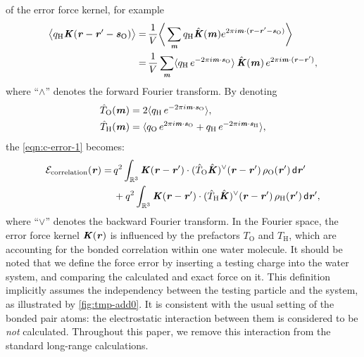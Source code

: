\documentclass[journal=jacsat,manuscript=article]{achemso}
\newcommand{\recheck}[1]{{\color{black} #1}}
\renewcommand{\v}[1]{\textbf{\textit{#1}}}
\renewcommand{\d}[1]{\textsf{#1}}
\begin{document}
of the error force kernel, for example
\begin{align} \nonumber
  \big\langle
  q_{\textrm{H}}\v K(\v r - \v r' - \v s_{\textrm{O}})
  \big\rangle 
  =\,&
  \frac1V\bigg\langle
  \sum_{\v m}
  q_{\textrm{H}}\hat{\v K}(\v m)
  e^{2\pi i\v m\cdot(\v r - \v r' - \v s_{\textrm{O}})} 
  \bigg\rangle \\\nonumber
  =\,&
  \frac1V\sum_{\v m}
  \langle
  q_{\textrm{H}}\,e^{-2\pi i\v m\cdot\v s_{\textrm{O}}}
  \rangle\,
  \hat{\v K}(\v m)\,
  e^{2\pi i\v m\cdot(\v r - \v r')},
\end{align}
where ``$\wedge$'' denotes the forward Fourier transform. By denoting
\begin{align}\label{eqn:tom}
  \hat T_{\textrm{O}}(\v m)
  &= 
  2\langle
  q_{\textrm{H}}\,e^{-2\pi i\v m\cdot\v s_{\textrm{O}}}
  \rangle,\\\label{eqn:thm}
  \hat T_{\textrm{H}}(\v m)
  &= 
  \langle
  q_{\textrm{O}}\,e^{2\pi i\v m\cdot\v s_{\textrm{O}}} +
  q_{\textrm{H}}\,e^{-2\pi i\v m\cdot\v s_{\textrm{H}}}
  \rangle,
\end{align}
the \ref{eqn:c-error-1} becomes:
\begin{align}\nonumber
  \mathcal E_{\textrm{correlation}}(\v r)
  =&\,
  q^2
  \int_{\mathbb R^3}
  \v K(\v r - \v r')\cdot
  (\hat T_{\textrm{O}}\hat{\v K})^{\vee}(\v r - \v r')
  \,\rho_{\textrm{O}}(\v r')
  \,\d d\v r' \\\label{eqn:c-error-water}
  & \,+
  q^2
  \int_{\mathbb R^3}
  \v K(\v r - \v r')\cdot
  (\hat T_{\textrm{H}}\hat{\v K})^{\vee}(\v r - \v r')
  \,\rho_{\textrm{H}}(\v r')
  \,\d d\v r',
\end{align}
where ``$\vee$'' denotes the backward Fourier transform.
In the Fourier space, the error force kernel $\v K(\v r)$ is
influenced by the prefactors $T_{\textrm{O}}$ and $T_{\textrm{H}}$,
which are accounting for the bonded correlation within one water
molecule. 
\recheck{
It should be noted that we define the force error by inserting a
testing charge into the water system, and comparing the
calculated and exact force on it. This definition implicitly assumes
the independency between the testing particle and the
system, as illustrated by \ref{fig:tmp-add0}.
It is consistent
with the usual setting of the bonded pair atoms: the electrostatic interaction
between them is considered to be \emph{not} calculated.
Throughout this paper, we remove this interaction from the
standard long-range calculations.}
\end{document}
